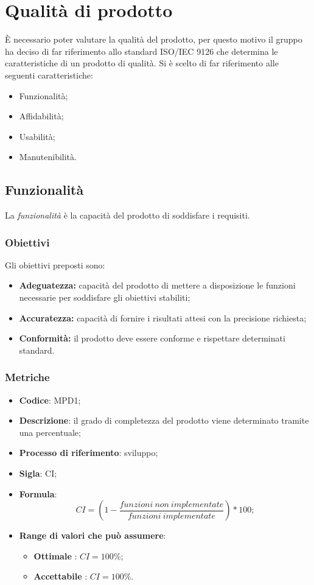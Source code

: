 \section{Qualità di prodotto}
È necessario poter valutare la qualità del prodotto, per questo motivo il gruppo \Omicron{} ha deciso di far riferimento allo standard ISO/IEC 9126 che determina le caratteristiche di un prodotto di qualità. Si è scelto di far riferimento alle seguenti caratteristiche:
\begin {itemize}
	\item{Funzionalità;}
	\item{Affidabilità;}
	\item{Usabilità;}
	\item{Manutenibilità.}
\end{itemize}

\subsection{Funzionalità}
La \textit{funzionalità} è la capacità del prodotto di soddisfare i requisiti.
\subsubsection{Obiettivi}
Gli obiettivi preposti sono:
\begin {itemize}
	\item \textbf{Adeguatezza:} capacità del prodotto di mettere a disposizione le funzioni necessarie per soddisfare gli obiettivi stabiliti;
	\item \textbf{Accuratezza:} capacità di fornire i risultati attesi con la precisione richiesta;
	\item \textbf{Conformità:} il prodotto deve essere conforme e rispettare determinati standard.
\end{itemize}
\subsubsection{Metriche}
\vspace{-1cm}
\begin{itemize}
	\item \textbf{Codice}: MPD1;
	\item \textbf{Descrizione}: il grado di completezza del prodotto viene determinato tramite una percentuale;
	\item \textbf{Processo di riferimento}: sviluppo;
	\item \textbf{Sigla}: CI;
	\item \textbf{Formula}: \[CI=\left(1-\frac{funzioni \ non \ implementate}{funzioni \ implementate}\right)\ast100;\]
	\item \textbf{Range di valori che può assumere}: 
		\begin{itemize}
			\item \textbf{Ottimale} : $CI = 100 \%$;
			\item \textbf{Accettabile} : $CI = 100 \%$.
		\end{itemize}
\end{itemize}

